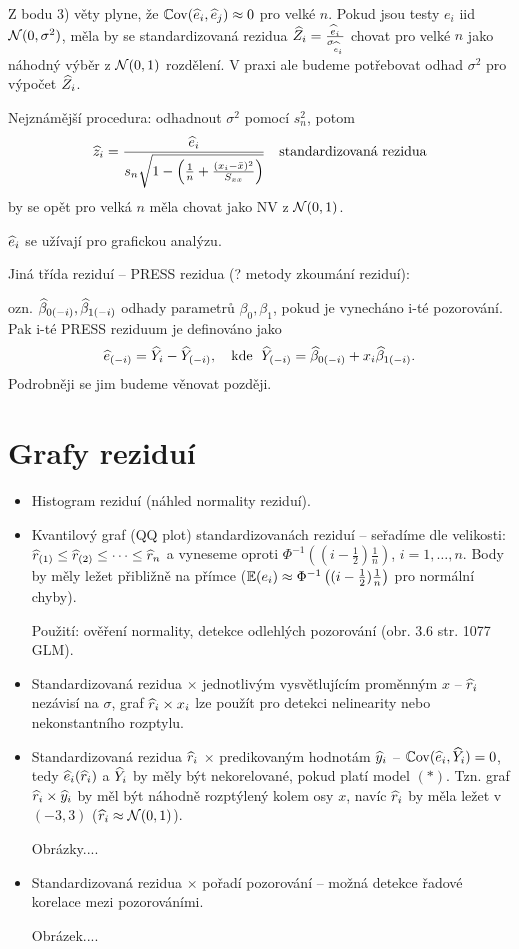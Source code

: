 \begin{remark}
	Z bodu 3) věty plyne, že $\mathbb{C}\mathrm{ov}(\widehat{e}_i, \widehat{e}_j) \approx 0$ pro velké $n$. Pokud jsou testy $e_i$ iid $\mathcal{N}(0,\sigma^2)$, měla by se standardizovaná rezidua $\widehat{Z}_i = \frac{\widehat{e}_i}{\sigma_{\widehat{e}_i}}$ chovat pro velké $n$ jako náhodný výběr z $\mathcal{N}(0,1)$ rozdělení. V praxi ale budeme potřebovat odhad $\sigma^2$ pro výpočet $\widehat{Z}_i$.
	
	Nejznámější procedura: odhadnout $\sigma^2$ pomocí $s_n^2$, potom
	$$
		\widehat{z}_i = \frac{\widehat{e}_i}{s_n \sqrt{1 - \left( \frac{1}{n} + \frac{(x_i - \bar{x})^2}{S_{xx}} \right)}} \quad \text{standardizovaná rezidua}
	$$
	by se opět pro velká $n$ měla chovat jako NV z $\mathcal{N}(0,1)$.
\end{remark}

\begin{remark}
	$\widehat{e}_i$ se užívají pro grafickou analýzu.
	
	Jiná třída reziduí -- PRESS rezidua (? metody zkoumání reziduí):
	
	ozn. $\widehat{\beta}_{0(-i)}, \widehat{\beta}_{1(-i)}$ odhady parametrů $\beta_0, \beta_1$, pokud je vynecháno i-té pozorování. Pak i-té PRESS reziduum je definováno jako
	$$
		\widehat{e}_{(-i)} = \widehat{Y}_i - \widehat{Y}_{(-i)}, \quad \text{kde \;} \widehat{Y}_{(-i)} = \widehat{\beta}_{0(-i)} + x_i \widehat{\beta}_{1(-i)}.
	$$
	Podrobněji se jim budeme věnovat později.
\end{remark}

\section{Grafy reziduí}
\begin{itemize}
	\item Histogram reziduí (náhled normality reziduí).
	\item Kvantilový graf (QQ plot) standardizovanách reziduí -- seřadíme dle velikosti: $\widehat{r}_{(1)} \leq \widehat{r}_{(2)} \leq \dots \leq \widehat{r}_{n}$ a vyneseme oproti $\Phi^{-1}\left( (i - \frac{1}{2}) \frac{1}{n} \right)$, $i = 1, \dots, n$. Body by měly ležet přibližně na přímce ($\mathbb{E} (e_{i} ) \approx \Phi^{-1}\left( (i - \frac{1}{2}) \frac{1}{n} \right)$ pro normální chyby).
	
	Použití: ověření normality, detekce odlehlých pozorování (obr. 3.6 str. 1077 GLM).
	\item Standardizovaná rezidua $\times$ jednotlivým vysvětlujícím proměnným $x$ -- $\widehat{r}_i$ nezávisí na $\sigma$, graf $\widehat{r}_i \times x_i$ lze použít pro detekci nelinearity nebo nekonstantního rozptylu.
	\item Standardizovaná rezidua $\widehat{r}_i$ $\times$ predikovaným hodnotám $\widehat{y}_i$ -- $\mathbb{C}\mathrm{ov}(\widehat{e}_i, \widehat{Y}_i) = 0$, tedy $\widehat{e}_i(\widehat{r}_i)$ a $\widehat{Y}_i$ by měly být nekorelované, pokud platí model $(*)$. Tzn. graf $\widehat{r}_i \times \widehat{y}_i$ by měl být náhodně rozptýlený kolem osy $x$, navíc $\widehat{r}_i$ by měla ležet v $(-3,3)$ ($\widehat{r}_i \approx \mathcal{N}(0,1)$).
	
	Obrázky....
	
	\item Standardizovaná rezidua $\times$ pořadí pozorování -- možná detekce řadové korelace mezi pozorováními.
	
	Obrázek....
\end{itemize}